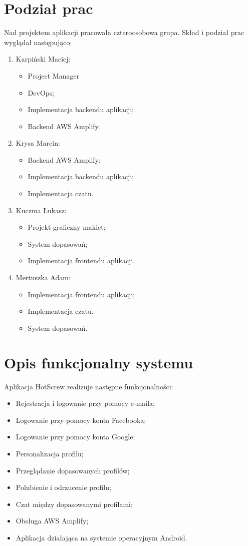 \documentclass[12pt,a4paper]{article}
\begin{document}
	\section{Podział prac}
	\indent Nad projektem aplikacji pracowała czteroosobowa grupa. Skład i podział prac wyglądał następująco:
	\begin{enumerate}
		\item Karpiński Maciej:
			\begin{itemize}
				\item Project Manager
				\item DevOps;
				\item Implementacja backendu aplikacji;
				\item Backend AWS Amplify.
			\end{itemize}
		\item Krysa Marcin:
			\begin{itemize}
				\item Backend AWS Amplify;
				\item Implementacja backendu aplikacji;
				\item Implementacja czatu.
			\end{itemize}
		\item Kuczma Łukasz:
			\begin{itemize}
				\item Projekt graficzny makiet;
				\item System dopasowań;
				\item Implementacja frontendu aplikacji.
			\end{itemize}
		\item Mertuszka Adam:
			\begin{itemize}
				\item Implementacja frontendu aplikacji;
				\item Implementacja czatu.
				\item System dopasowań.
			\end{itemize}	
	\end{enumerate}
		\newpage
	\section{Opis funkcjonalny systemu}	
	\indent Aplikacja HotScrew realizuje następne funkcjonalności:
	\begin{itemize}
		\item Rejestracja i logowanie przy pomocy e-maila;
		\item Logowanie przy pomocy konta Facebooka;
		\item Logowanie przy pomocy konta Google;
		\item Personalizacja profilu;
		\item Przeglądanie dopasowanych profilów;
		\item Polubienie i odrzucenie profilu;
		\item Czat między dopasowanymi profilami;
		\item Obsługa AWS Amplify;
		\item Aplikacja działająca na systemie operacyjnym Android.
	\end{itemize}
		\newpage
\end{document}

